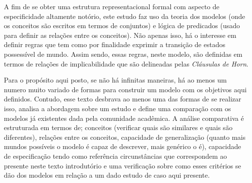 \documentclass[12pt]{article}
\begin{document}
A fim de se obter uma estrutura representacional formal com aspecto de especificidade altamente notório, este estudo faz uso da teoria dos modelos (onde os conceitos são escritos em termos de conjuntos) e lógica de predicados (usado para definir as relações entre os conceitos). Não apenas isso, há o interesse em definir regras que tem como por finalidade exprimir a transição de estados possessível de mundo. Assim sendo, essas regras, neste modelo, são definidas em termos de relações de implicabilidade que são delineadas pelas \textit{Cláusulas de Horn}.


Para o propósito aqui posto, se não há infinitas maneiras, há ao menos um numero muito variado de formas para construir um modelo com os objetivos aqui definidos. Contudo, esse texto desbrava ao menos uma das formas de se realizar isso, analisa a abordagem sobre um estudo e define uma comparação com os modelos já existentes dada pela comunidade acadêmica. A análise comparativa é estruturada em termos de; conceitos (verificar quais são similares e quais são diferentes), relações entre os conceitos, capacidade de generalização (quanto mais mundos possíveis o modelo é capaz de descrever, mais genérico o é), capacidade de especificação tendo como referência circunstâncias que correspondem ao presente neste texto introdutório e uma verificação sobre como esses critérios se dão dos modelos em relação a um dado estudo de caso aqui presente. 



\end{document}
